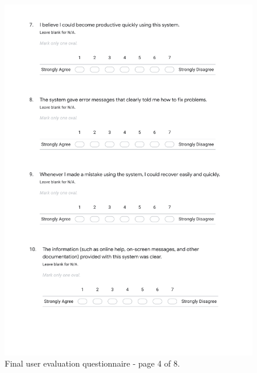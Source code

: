 \documentclass{l4proj}
\begin{document}
\begin{appendices}
\begin{figure}[htb]
    \centering
    \includegraphics[width=\linewidth]{images/final_evaluation_4.pdf}    
    \caption{Final user evaluation questionnaire - page 4 of 8.}
    \label{fig:final_evaluation_4} 
\end{figure}


\end{appendices}
\end{document}
